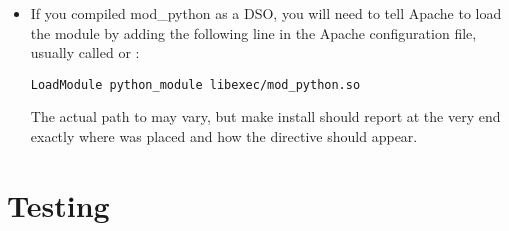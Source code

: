\begin{itemize}

\item
If you compiled mod_python as a DSO, you will need to tell Apache to
load the module by adding the following line in the Apache
configuration file, usually called  or
:

\begin{verbatim}
LoadModule python_module libexec/mod_python.so
\end{verbatim}

The actual path to  may vary, but make install
should report at the very end exactly where 
was placed and how the  directive should appear.


                            


\end{itemize}

\section{Testing\label{inst-testing}}

